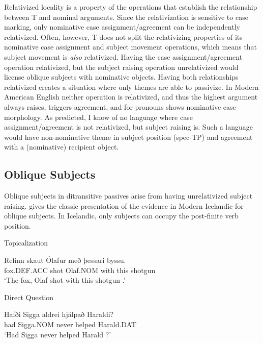 Relativized locality is a property of the operations that establish the relationship between T and nominal arguments. Since the relativization is sensitive to case marking, only nominative case assignment/agreement can be independently relativized. Often, however, T does not split the relativizing properties of its nominative case assignment and subject movement operations, which means that subject movement is \emph{also} relativized. Having the case assignment/agreement operation relativized, but the subject raising operation unrelativized would license oblique subjects with nominative objects. Having both relationships relativized creates a situation where only themes are able to passivize. In Modern American English neither operation is relativized, and thus the highest argument always raises, triggers agreement, and for pronouns shows nominative case morphology. As predicted, I know of no language where case assignment/agreement is not relativized, but subject raising is. Such a language would have non-nominative theme in subject position (spec-TP) and agreement with a (nominative) recipient object.

\subsection{Oblique Subjects}\label{sec:ObliqueSubj}
Oblique subjects in ditransitive passives arise from having unrelativized subject raising. \cite{Zaenen.1985} gives the classic presentation of the evidence in Modern Icelandic for oblique subjects. In Icelandic, only subjects can occupy the post-finite verb position.

\begin{exe}
\ex Topicalization
\begin{xlist}
\ex \gll Refinn skaut Ólafur með  þessari byssu.\\
fox.DEF.ACC shot Olaf.NOM with this shotgun\\
\trans `The fox, Olaf shot with this shotgun \citep[ex. 19a]{Zaenen.1985}.'
\end{xlist}
\ex Direct Question
\begin{xlist}
\ex \gll Hafði Sigga aldrei hjálpað Haraldi?\\
had Sigga.NOM never helped Harald.DAT\\
\trans `Had Sigga never helped Harald \citep[ex. 20b]{Zaenen.1985}?'
\end{xlist}
\end{exe}

